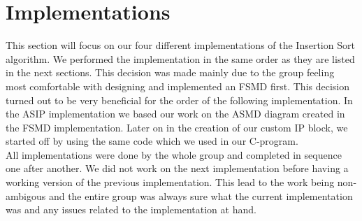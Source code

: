 \documentclass[conference]{IEEEtran}
\begin{document}
\section{Implementations}
This section will focus on our four different implementations of the Insertion Sort algorithm. We performed the implementation in the same order as they are listed in the next sections. This decision was made mainly due to the group feeling most comfortable with designing and implemented an FSMD first. This decision turned out to be very beneficial for the order of the following implementation. In the ASIP implementation we based our work on the ASMD diagram created in the FSMD implementation. Later on in the creation of our custom IP block, we started off by using the same code which we used in our C-program. \\
All implementations were done by the whole group and completed in sequence one after another. We did not work on the next implementation before having a working version of the previous implementation. This lead to the work being non-ambigous and the entire group was always sure what the current implementation was and any issues related to the implementation at hand.
\end{document}
